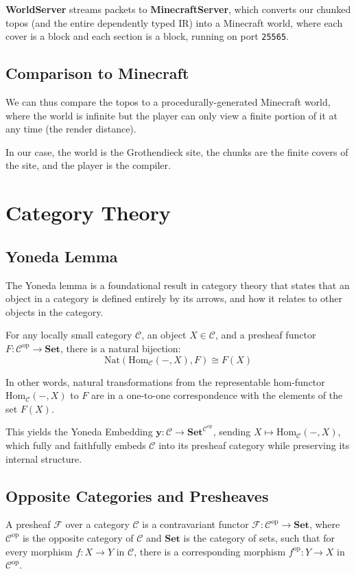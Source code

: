 \documentclass[11pt]{article}
\begin{document}
\textbf{WorldServer} streams packets to \textbf{MinecraftServer}, which converts our chunked topos (and the entire dependently typed IR) into
a Minecraft world, where each cover is a block and each section is a block, running on port \texttt{25565}.

\subsection{Comparison to Minecraft}
We can thus compare the topos to a procedurally-generated Minecraft world, where the world is infinite but the
player can only view a finite portion of it at any time (the render distance).

In our case, the world is the Grothendieck site, the chunks are the finite covers of the site, and the player is the compiler.


\section{Category Theory}

\subsection{Yoneda Lemma}
The Yoneda lemma is a foundational result in category theory that states that an object
in a category is defined entirely by its arrows, and how it relates to other objects in the category.

For any locally small category $\mathcal{C}$, an object $X \in \mathcal{C}$, and a presheaf functor $F: \mathcal{C}^{\text{op}} \to \textbf{Set}$, there is a natural bijection:
\[
    \text{Nat}(\text{Hom}_{\mathcal{C}}(-, X), F) \cong F(X)
\]

In other words, natural transformations from the representable hom-functor $\text{Hom}_{\mathcal{C}}(-, X)$ to $F$ are in a one-to-one correspondence with the elements of the set $F(X)$.

This yields the Yoneda Embedding $\textbf{y}: \mathcal{C} \to \textbf{Set}^{\mathcal{C}^{\text{op}}}$, sending $X \mapsto \text{Hom}_{\mathcal{C}}(-, X)$, which fully and faithfully embeds $\mathcal{C}$ into its presheaf category while preserving its internal structure.

\subsection{Opposite Categories and Presheaves}
A presheaf $\mathcal{F}$ over a category $\mathcal{C}$ is a contravariant functor $\mathcal{F} : \mathcal{C}^\text{op} \to \textbf{Set}$, where $\mathcal{C}^\text{op}$ is the opposite category of $\mathcal{C}$ and $\textbf{Set}$ is the category of sets, such that for every morphism $f: X \to Y$ in $\mathcal{C}$, there is a corresponding morphism $f^{\text{op}}: Y \to X$ in $\mathcal{C}^{\text{op}}$.
\end{document}

